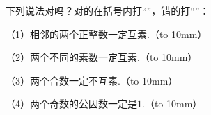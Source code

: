 下列说法对吗？对的在括号内打“\Checkmark”，错的打“\times”：

（1）相邻的两个正整数一定互素.（\hbox to 10mm{}）

（2）两个不同的素数一定互素.（\hbox to 10mm{}）

（3）两个合数一定不互素.（\hbox to 10mm{}）

（4）两个奇数的公因数一定是$1$.（\hbox to 10mm{}）